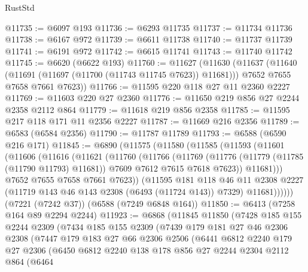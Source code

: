 \begin{lexlean}{RustStd}
\begin{coremodule}
@11735 := @6097 @193
@11736 := @6293 @11735
@11737 := @11734 @11736
@11738 := @6167 @972
@11739 := @6611 @11738
@11740 := @11737 @11739
@11741 := @6191 @972
@11742 := @6615 @11741
@11743 := @11740 @11742
@11745 := @6620 (@6622 @193)
@11760 := @11627
    (@11630
      (@11637
        (@11640 (@11691 (@11697 (@11700 (@11743 @11745 @7623)) @11681)))
        @7652
        @7655
        @7658
        @7661
        @7623))
@11766 := @11595 @220 @118 @27 @11 @2360 @2227
@11769 := @11603 @220 @27 @2360
@11776 := @11650 @219 @856 @27 @2244 @2358 @2112 @864
@11779 := @11618 @219 @856 @2358
@11785 := @11595 @217 @118 @171 @11 @2356 @2227
@11787 := @11669 @216 @2356
@11789 := @6583 (@6584 @2356)
@11790 := @11787 @11789
@11793 := @6588 (@6590 @216 @171)
@11845 := @6890
    (@11575
      (@11580
        (@11585
          (@11593
            (@11601
              (@11606
                (@11616
                  (@11621
                    (@11760
                      (@11766
                        (@11769
                          (@11776
                            (@11779 (@11785 (@11790 @11793) @11681))
                            @7609
                            @7612
                            @7615
                            @7618
                            @7623))
                        @11681)))
                  @7652
                  @7655
                  @7658
                  @7661
                  @7623))
              (@11595
                @181
                @118
                @46
                @11
                @2308
                @2227
                (@11719 @143 @46 @143 @2308 (@6493 (@11724 @143)) @7329)
                @11681))))))
    (@7221 (@7242 @37))
    (@6588 (@7249 @6848 @164))
@11850 := @6413 (@7258 @164 @89 @2294 @2244)
@11923 := @6868
    (@11845
      @11850
      (@7428
        @185
        @155
        @2244
        @2309
        (@7434
          @185
          @155
          @2309
          (@7439
            @179
            @181
            @27
            @46
            @2306
            @2308
            (@7447
              @179
              @183
              @27
              @66
              @2306
              @2506
              (@6441
                @6812
                @2240
                @179
                @27
                @2306
                (@6450
                  @6812
                  @2240
                  @138
                  @178
                  @856
                  @27
                  @2244
                  @2304
                  @2112
                  @864
                  (@6464

\end{coremodule}
\end{lexlean}

